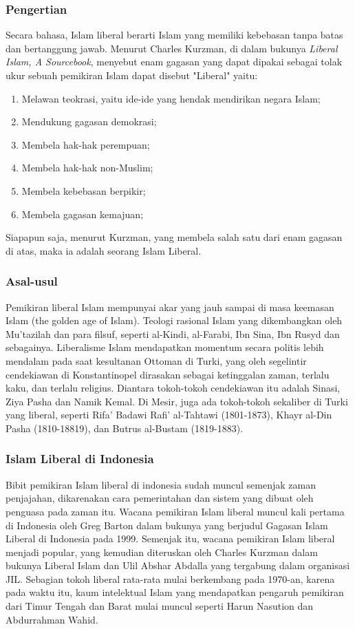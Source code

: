 \documentclass[a4paper,12 pt]{article}%
\begin{document}
\subsubsection{Pengertian}
Secara bahasa, Islam liberal berarti Islam yang memiliki kebebasan tanpa batas dan bertanggung 
jawab. Menurut Charles Kurzman, di dalam bukunya \textit{Liberal Islam, A Sourcebook}, menyebut enam gagasan 
yang dapat dipakai sebagai tolak ukur sebuah pemikiran Islam dapat disebut "Liberal" yaitu: 
\begin{enumerate}
    \item Melawan teokrasi, yaitu ide-ide yang hendak mendirikan negara Islam; 
    \item Mendukung gagasan demokrasi; 
    \item Membela hak-hak perempuan; 
    \item Membela hak-hak non-Muslim; 
    \item Membela kebebasan berpikir; 
    \item Membela gagasan kemajuan; 
\end{enumerate}
Siapapun saja, menurut Kurzman, yang membela salah satu dari enam gagasan di atas, maka ia adalah 
seorang Islam Liberal\parencites{zaki}.
\subsubsection{Asal-usul}
Pemikiran liberal Islam mempunyai akar yang jauh sampai di masa keemasan Islam (the golden age of 
Islam). Teologi rasional Islam yang dikembangkan oleh Mu'tazilah  dan para filsuf, seperti al-Kindi, 
al-Farabi, Ibn Sina, Ibn Rusyd dan sebagainya. Liberalisme Islam mendapatkan momentum secara 
politis lebih mendalam pada saat kesultanan Ottoman di Turki, yang oleh segelintir cendekiawan di 
Konstantinopel dirasakan sebagai ketinggalan zaman, terlalu kaku, dan terlalu religius. Diantara 
tokoh-tokoh cendekiawan itu adalah Sinasi, Ziya Pasha dan Namik Kemal. Di Mesir, juga ada 
tokoh-tokoh sekaliber di Turki yang liberal, seperti Rifa' Badawi Rafi' al-Tahtawi (1801-1873), 
Khayr al-Din Pasha (1810-18819), dan Butrus al-Bustam (1819-1883)\parencite{zaki}.
\subsubsection{Islam Liberal di Indonesia}
Bibit pemikiran Islam liberal di indonesia sudah muncul semenjak zaman penjajahan, dikarenakan cara 
pemerintahan dan sistem yang dibuat oleh penguasa pada zaman itu. 
Wacana pemikiran Islam liberal muncul kali pertama di Indonesia oleh Greg Barton dalam bukunya 
yang berjudul Gagasan Islam Liberal di Indonesia pada 1999. Semenjak itu, wacana pemikiran Islam 
liberal menjadi popular, yang kemudian diteruskan oleh Charles Kurzman dalam bukunya Liberal Islam 
dan Ulil Abshar Abdalla yang tergabung dalam organisasi JIL. Sebagian tokoh liberal rata-rata 
mulai berkembang pada 1970-an, karena pada waktu itu, kaum intelektual Islam yang mendapatkan 
pengaruh pemikiran dari Timur Tengah dan Barat mulai muncul seperti Harun Nasution dan Abdurrahman 
Wahid\parencite{samsudin}.
\end{document}
